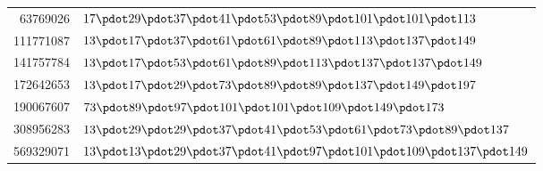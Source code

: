 %
\begingroup\small\setlength{\tabcolsep}{5pt}
\begin{longtable}{@{}r|l@{}}
63769026 & $17\pdot 29\pdot 37\pdot 41\pdot 53\pdot 89\pdot 101\pdot 101\pdot 113$\\
111771087 & $13\pdot 17\pdot 37\pdot 61\pdot 61\pdot 89\pdot 113\pdot 137\pdot 149$\\
141757784 & $13\pdot 17\pdot 53\pdot 61\pdot 89\pdot 113\pdot 137\pdot 137\pdot 149$\\
172642653 & $13\pdot 17\pdot 29\pdot 73\pdot 89\pdot 89\pdot 137\pdot 149\pdot 197$\\
190067607 & $73\pdot 89\pdot 97\pdot 101\pdot 101\pdot 109\pdot 149\pdot 173$\\
308956283 & $13\pdot 29\pdot 29\pdot 37\pdot 41\pdot 53\pdot 61\pdot 73\pdot 89\pdot 137$\\
569329071 & $13\pdot 13\pdot 29\pdot 37\pdot 41\pdot 97\pdot 101\pdot 109\pdot 137\pdot 149$\\
\end{longtable}\endgroup
\par\medskip\begingroup\small\setlength{\tabcolsep}{5pt}
